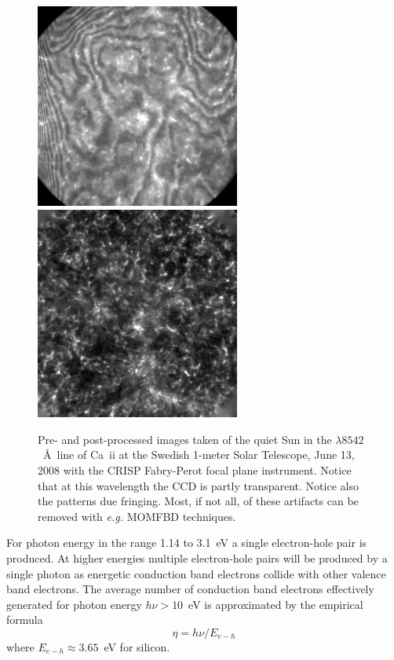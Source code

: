 \begin{figure}[p]
	\centering
		\includegraphics[width=0.6\textwidth]{camXXV_13Jun2008_8542_raw.eps}
		\includegraphics[width=0.6\textwidth]{camXXV_13Jun2008_8542_momfbd.eps}
	\caption{Pre- and post-processed images taken of the quiet Sun in the 
	$\lambda 8542$~\AA\ line of Ca~{\sc ii} at the Swedish 1-meter Solar 
	Telescope, June 13, 2008 with the CRISP Fabry-Perot focal plane instrument. 
	Notice that at this wavelength the CCD is partly transparent.
	Notice also the patterns due fringing. Most, if not all, of these
	artifacts can be removed with {\it e.g.} MOMFBD techniques.}
	\label{fig:crisp8542raw-momfbd}
\end{figure}

For photon energy in the range 1.14 to 3.1~eV a single electron-hole pair
is produced. At higher energies multiple electron-hole pairs will be
produced by a single photon as energetic conduction band electrons
collide with other valence band electrons. The average number of
conduction band electrons effectively generated for photon energy
$h\nu > 10$~eV is approximated by the empirical formula
\begin{equation}
  \eta = h\nu/E_{e-h}
\end{equation}
where $E_{e-h} \approx 3.65$~eV for silicon.

